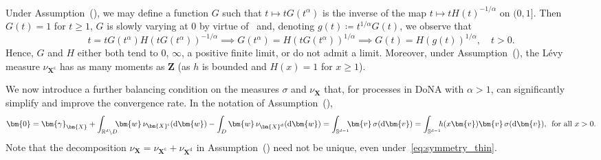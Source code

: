 \documentclass[en,oneside,bbfont,article]{amsart}
\theoremstyle{remark}
\theoremstyle{definition}
\theoremstyle{definition}
\newcommand\Sp{\mathbb{S}}
\newcommand\R{\mathbb{R}}
\newcommand\1{\mathds{1}}
\renewcommand\ge{\geqslant}
\newcommand\co{\mathsf{c}}
\newcommand{\D}{\mathrm{d}}
\begin{document}
Under Assumption~(), we may define a function $G$ such that $t\mapsto tG(t^\alpha)$ is the inverse of the map $t\mapsto tH(t)^{-1/\alpha}$ on $(0,1]$. Then $G(t)=1$ for $t\ge 1$, $G$ is slowly varying at $0$ by virtue of~\cite[Thm~1.5.12]{MR1015093} and, denoting $g(t)\coloneqq t^{1/\alpha}G(t)$, we observe that
\begin{equation}
\label{eq:G-H}
t=tG(t^\alpha)H(tG(t^\alpha))^{-1/\alpha}
\implies
G(t^\alpha)=H(tG(t^\alpha))^{1/\alpha}
\implies 
G(t)=H(g(t))^{1/\alpha},
\quad t>0.
\end{equation}
Hence, $G$ and $H$ either both tend to $0$, $\infty$, a positive finite limit, or do not admit a limit. Moreover, under Assumption~(), the L\'evy measure $\nu_{\bm{X}^\co}$ has as many moments as $\bm{Z}$ (as $h$ is bounded and $H(x)=1$ for $x\ge 1$).

We now introduce a further balancing condition on the measures $\sigma$ and $\nu_{\bm{X}}$ that, for processes in DoNA with $\alpha>1$, can significantly simplify and improve the convergence rate. In the notation of Assumption~(),
\begin{equation}
\label{eq:symmetry_thin}
\bm{0}
=\bm{\gamma}_{\bm{X}}
+\int_{\R^d\setminus D}\!\!\!\bm{w}\,\nu_{\bm{X}^\co}(\D\bm{w})
-\int_{D}\bm{w}\,\nu_{\bm{X}^\D}(\D\bm{w})
=\int_{\Sp^{d-1}}\!\!\!\bm{v}\,\sigma(\D\bm{v})
=\int_{\Sp^{d-1}}\!\!\! h(x\bm{v})\bm{v}\,\sigma(\D\bm{v}), 
\enskip\text{for all }x>0.
\end{equation}
Note that the decomposition $\nu_{\bm{X}}=\nu_{\bm{X}^\co}+\nu_{\bm{X}^\D}$ in Assumption~() need not be unique, even under~\eqref{eq:symmetry_thin}.
\end{document}

